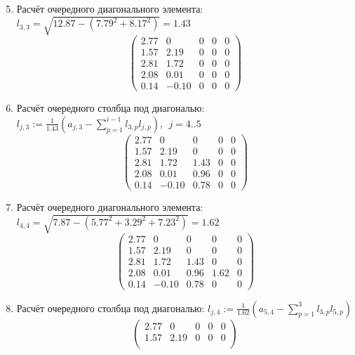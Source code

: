 \begin{multicols}{3}
    \begin{enumerate}
    \setcounter{enumi}{4}
    \item Расчёт очередного диагонального элемента: $l_{3,3} = \sqrt{12.87 - (7.79^2+8.17^2)} = 1.43$
    $$\begin{pmatrix}
        2.77 & 0     & 0    & 0 & 0 \\
        1.57 & 2.19  & 0    & 0 & 0 \\
        2.81 & 1.72  & 0    & 0 & 0 \\
        2.08 & 0.01  & 0    & 0 & 0 \\
        0.14 & -0.10 & 0    & 0 & 0
    \end{pmatrix}$$
    \vspace{-0.5cm}
    \item Расчёт очередного столбца под диагональю: $l_{j,3} := \frac{1}{1.43}(a_{j,3} - \sum_{p=1}^{i-1}l_{3,p}l_{j,p}),~~j=4..5$
    $$\begin{pmatrix}
        2.77 & 0     & 0    & 0 & 0 \\
        1.57 & 2.19  & 0    & 0 & 0 \\
        2.81 & 1.72  & 1.43 & 0 & 0 \\
        2.08 & 0.01  & 0.96 & 0 & 0 \\
        0.14 & -0.10 & 0.78 & 0 & 0
    \end{pmatrix}$$
    \vspace{-0.5cm}
    \item Расчёт очередного диагонального элемента: $l_{4,4} = \sqrt{7.87 - (5.77^2+3.29^2+7.23^2)} = 1.62$
    $$\begin{pmatrix}
        2.77 & 0     & 0    & 0    & 0 \\
        1.57 & 2.19  & 0    & 0    & 0 \\
        2.81 & 1.72  & 1.43 & 0    & 0 \\
        2.08 & 0.01  & 0.96 & 1.62 & 0 \\
        0.14 & -0.10 & 0.78 & 0    & 0
    \end{pmatrix}$$
    \vspace{-0.5cm}
    \item Расчёт очередного столбца под диагональю: $l_{j,4} := \frac{1}{1.62}(a_{5,4} - \sum_{p=1}^{3}l_{3,p}l_{5,p})$
    $$\begin{pmatrix}
        2.77 & 0     & 0    & 0    & 0 \\
        1.57 & 2.19  & 0    & 0    & 0 \\

\end{pmatrix}$$
\end{enumerate}
\end{multicols}
